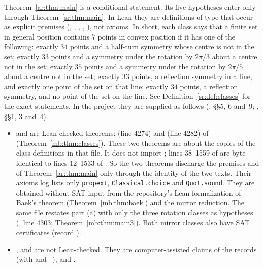 \begin{remark}\label{ar:rem:classes}
Theorem~\ref{ar:thm:main} is a conditional statement. Its five hypotheses enter only through
Theorem~\ref{sr:thm:main}. In Lean they are definitions of type  that occur as explicit premises
(, , , , ), not axioms. In short, each class says that a finite set in
general position contains $7$ points in convex position if it has one of the following: exactly $34$ points and a
half-turn symmetry whose centre is not in the set; exactly $33$ points and a symmetry under the rotation by $2\pi/3$
about a centre not in the set; exactly $35$ points and a symmetry under the rotation by $2\pi/5$ about a centre not in
the set; exactly $33$ points, a reflection symmetry in a line, and exactly one point of the set on that line; exactly
$34$ points, a reflection symmetry, and no point of the set on the line. See Definition~\ref{sr:def:classes} for the
exact statements. In the project they are supplied as follows (, \S\S5, 6 and~9;
, \S\S1, 3 and~4).
\begin{itemize}
\item {} and  are Lean-checked theorems: 
(line 4274) and  (line 4282) of 
(Theorem~\ref{mb:thm:classes}). These two theorems are about the copies of the class definitions in that file. It does
not import ; lines 38--1559 of  are
byte-identical to lines 12--1533 of . So the two theorems discharge the premises
 and  of Theorem~\ref{ar:thm:main} only through the identity of the two texts. Their axioms log
 lists only \texttt{propext}, \texttt{Classical.choice} and \texttt{Quot.sound}. They
are obtained without SAT input from the repository's Lean formalization of Baek's theorem
(Theorem~\ref{mb:thm:baek}) and the mirror reduction. The same file restates part (a) with
only the three rotation classes as hypotheses (, line 4303;
Theorem~\ref{mb:thm:main3}). Both mirror classes also have SAT certificates (record ).
\item {},  and  are not Lean-checked. They are computer-assisted
claims of the records  (with  and --),  and .

\end{itemize}
\end{remark}
